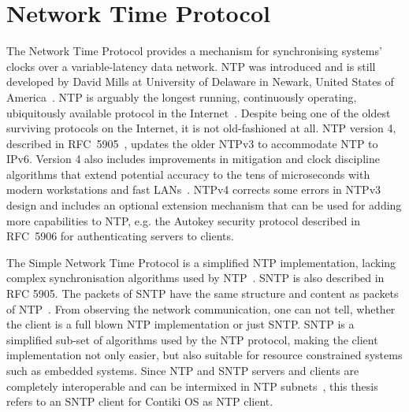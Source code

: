
\chapter{Network Time Protocol}
The Network Time Protocol provides a mechanism for synchronising systems' clocks over a variable-latency data network.
NTP was introduced and is still developed by
David Mills at University of Delaware in Newark, United States of America~\cite{ntp-history}.
NTP is arguably the longest running, continuously operating,
ubiquitously available protocol in the Internet~\cite{ntp-overview}.
Despite being one of the oldest surviving protocols on the Internet, it is not old-fashioned at all.
NTP version 4, described in RFC~5905~\cite{rfc5905}, updates the older NTPv3 to accommodate NTP to IPv6.
Version 4 also includes improvements in
mitigation and clock discipline algorithms that extend
potential accuracy to the tens of microseconds with modern
workstations and fast LANs~\cite{rfc5905}.
NTPv4 corrects some
errors in NTPv3 design and includes an optional extension mechanism
that can be used for adding more capabilities to NTP, e.g. the
Autokey security protocol described in RFC~5906
for authenticating servers to clients.

The Simple Network Time Protocol is a simplified NTP implementation, lacking complex
synchronisation algorithms used by NTP~\cite{rfc5905}.
SNTP is also described in RFC 5905.
The packets of SNTP have the same structure and content as packets of NTP~\cite{rfc5905}.
From observing the network communication, one can not tell, whether the client
is a full blown NTP implementation or just SNTP.
SNTP is a simplified sub-set of algorithms used by the NTP protocol,
making the client implementation not only easier, but also suitable for
resource constrained systems such as embedded systems.
Since NTP and SNTP servers and clients are
completely interoperable and can be intermixed in NTP subnets~\cite{rfc5905},
this thesis refers to an SNTP client for Contiki OS as NTP client.









